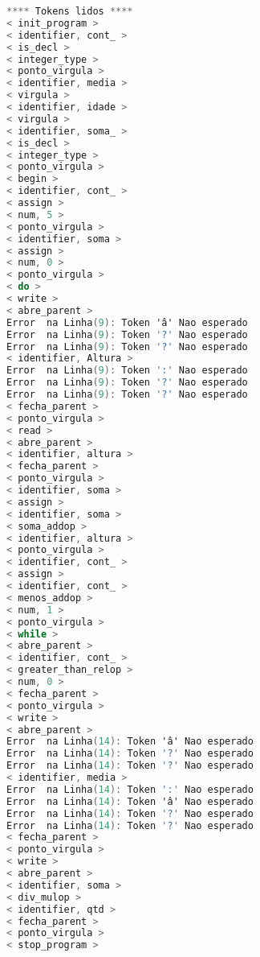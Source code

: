 \begin{lstlisting}[caption={Saida para o Codigo de teste  : Teste.txt},label={Entrada 1},language=C]
**** Tokens lidos ****
< init_program >
< identifier, cont_ >
< is_decl >
< integer_type >
< ponto_virgula >
< identifier, media >
< virgula >
< identifier, idade >
< virgula >
< identifier, soma_ >
< is_decl >
< integer_type >
< ponto_virgula >
< begin >
< identifier, cont_ >
< assign >
< num, 5 >
< ponto_virgula >
< identifier, soma >
< assign >
< num, 0 >
< ponto_virgula >
< do >
< write >
< abre_parent >
Error  na Linha(9): Token 'â' Nao esperado
Error  na Linha(9): Token '?' Nao esperado
Error  na Linha(9): Token '?' Nao esperado
< identifier, Altura >
Error  na Linha(9): Token ':' Nao esperado
Error  na Linha(9): Token '?' Nao esperado
Error  na Linha(9): Token '?' Nao esperado
< fecha_parent >
< ponto_virgula >
< read >
< abre_parent >
< identifier, altura >
< fecha_parent >
< ponto_virgula >
< identifier, soma >
< assign >
< identifier, soma >
< soma_addop >
< identifier, altura >
< ponto_virgula >
< identifier, cont_ >
< assign >
< identifier, cont_ >
< menos_addop >
< num, 1 >
< ponto_virgula >
< while >
< abre_parent >
< identifier, cont_ >
< greater_than_relop >
< num, 0 >
< fecha_parent >
< ponto_virgula >
< write >
< abre_parent >
Error  na Linha(14): Token 'â' Nao esperado
Error  na Linha(14): Token '?' Nao esperado
Error  na Linha(14): Token '?' Nao esperado
< identifier, media >
Error  na Linha(14): Token ':' Nao esperado
Error  na Linha(14): Token 'â' Nao esperado
Error  na Linha(14): Token '?' Nao esperado
Error  na Linha(14): Token '?' Nao esperado
< fecha_parent >
< ponto_virgula >
< write >
< abre_parent >
< identifier, soma >
< div_mulop >
< identifier, qtd >
< fecha_parent >
< ponto_virgula >
< stop_program >




\end{lstlisting}
